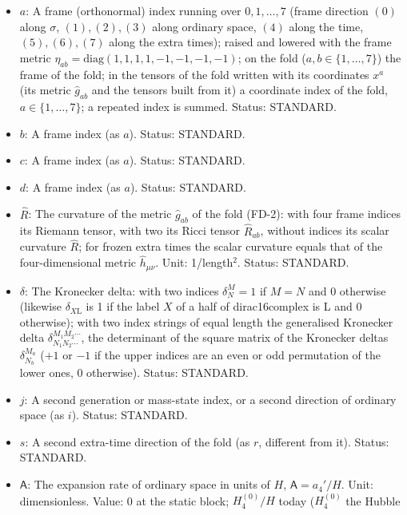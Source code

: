 \documentclass[
  10pt,
]{article}
\begin{document}
\begin{itemize}
  frame plane \((a, b)\). Unit: 1/length\(^2\). Status: STANDARD.
\item
  \(a\): A frame (orthonormal) index running over \(0, 1, \dots, 7\)
  (frame direction \((0)\) along \(\sigma\), \((1), (2), (3)\) along
  ordinary space, \((4)\) along the time, \((5), (6), (7)\) along the
  extra times); raised and lowered with the frame metric
  \(\eta_{ab} = \mathrm{diag}(1, 1, 1, 1, -1, -1, -1, -1)\); on the fold
  (\(a, b \in \{1, \dots, 7\}\)) the frame of the fold; in the tensors
  of the fold written with its coordinates \(x^a\) (its metric
  \(\hat g_{ab}\) and the tensors built from it) a coordinate index of
  the fold, \(a \in \{1, \dots, 7\}\); a repeated index is summed.
  Status: STANDARD.
\item
  \(b\): A frame index (as \(a\)). Status: STANDARD.
\item
  \(c\): A frame index (as \(a\)). Status: STANDARD.
\item
  \(d\): A frame index (as \(a\)). Status: STANDARD.
\item
  \(\hat R\): The curvature of the metric \(\hat g_{ab}\) of the fold
  (FD-2): with four frame indices its Riemann tensor, with two its Ricci
  tensor \(\hat R_{ab}\), without indices its scalar curvature
  \(\hat R\); for frozen extra times the scalar curvature equals that of
  the four-dimensional metric \(\hat h_{\mu\nu}\). Unit: 1/length\(^2\).
  Status: STANDARD.
\item
  \(\delta\): The Kronecker delta: with two indices \(\delta^M_N = 1\)
  if \(M = N\) and 0 otherwise (likewise \(\delta_{X\mathrm{L}}\) is 1
  if the label \(X\) of a half of dirac16complex is L and 0 otherwise);
  with two index strings of equal length the generalised Kronecker delta
  \(\delta^{M_1M_2\cdots}_{N_1N_2\cdots}\), the determinant of the
  square matrix of the Kronecker deltas \(\delta^{M_a}_{N_b}\) (\(+1\)
  or \(-1\) if the upper indices are an even or odd permutation of the
  lower ones, 0 otherwise). Status: STANDARD.
\item
  \(j\): A second generation or mass-state index, or a second direction
  of ordinary space (as \(i\)). Status: STANDARD.
\item
  \(s\): A second extra-time direction of the fold (as \(r\), different
  from it). Status: STANDARD.
\item
  \(\mathsf{A}\): The expansion rate of ordinary space in units of
  \(H\), \(\mathsf{A} = a_4'/H\). Unit: dimensionless. Value: 0 at the
  static block; \(H_4^{(0)}/H\) today (\(H_4^{(0)}\) the Hubble

\end{itemize}
\end{document}
